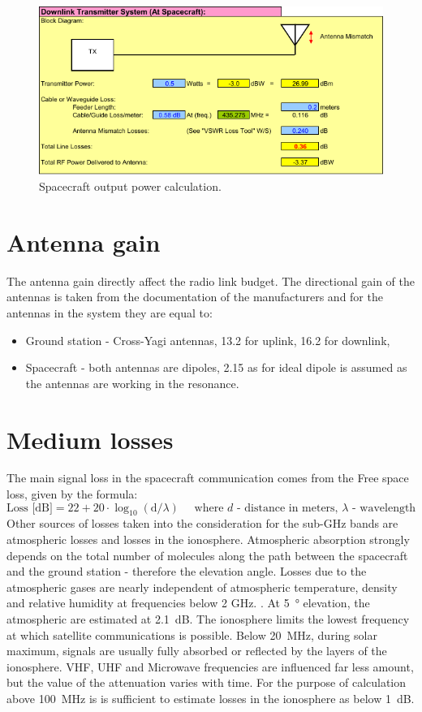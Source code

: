 \begin{figure}
    \centering
    \includegraphics[width=0.8\paperwidth]{img/8/tx_spacecraft.pdf}
    \caption{Spacecraft output power calculation.}
    \label{link:tx_spacecraft}
\end{figure}


\section{Antenna gain}
The antenna gain directly affect the radio link budget. The directional gain of the antennas is taken from the documentation of the manufacturers and for the antennas in the system they are equal to:
\begin{itemize}
    \item Ground station - Cross-Yagi antennas, \SI{13.2}{\dBi} for uplink, \SI{16.2}{\dBi} for downlink,
    \item Spacecraft - both antennas are dipoles, \SI{2.15}{\dBi} as for ideal dipole is assumed as the antennas are working in the resonance. 
\end{itemize}


\section{Medium losses}
The main signal loss in the spacecraft communication comes from the Free space loss, given by the formula: 
$$\text{Loss [dB]} = 22 + 20 \cdot \log_{10} (\text{d}/\lambda) \text{~~~~where $d$ - distance in meters, $\lambda$ - wavelength}$$ Other sources of losses taken into the consideration for the sub-GHz bands are atmospheric losses and losses in the ionosphere. Atmospheric absorption strongly depends on the total number of molecules along the path between the spacecraft and the ground station - therefore the elevation angle. Losses due to the atmospheric gases are nearly independent of atmospheric temperature, density and relative humidity at frequencies below 2 GHz. \cite{sat_propagation}. At \SI{5}{\degree} elevation, the atmospheric are estimated at \SI{2.1}{\dB}. The ionosphere limits the lowest frequency at which satellite communications is possible. Below \SI{20}{\MHz}, during solar maximum, signals are usually fully absorbed or reflected by the layers of the ionosphere. VHF, UHF and Microwave frequencies are influenced far less amount, but the value of the attenuation varies with time. For the purpose of calculation above \SI{100}{\MHz} is is sufficient to estimate losses in the ionosphere as below \SI{1}{\dB}.

